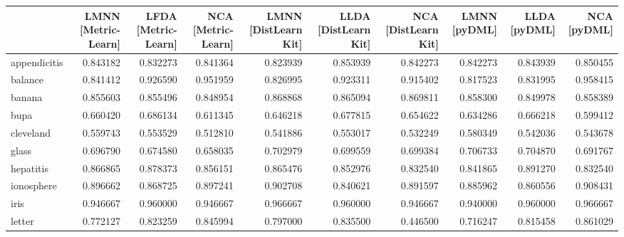 \begin{tabular}{lrrrrrrrrr}
\toprule
{} &  LMNN [Metric-Learn] &  LFDA [Metric-Learn] &  NCA [Metric-Learn] &  LMNN [DistLearn Kit] &  LLDA [DistLearn Kit] &  NCA [DistLearn Kit] &  LMNN [pyDML] &  LLDA [pyDML] &  NCA [pyDML] \\
\midrule
appendicitis    &             0.843182 &             0.832273 &            0.841364 &              0.823939 &              0.853939 &             0.842273 &      0.842273 &      0.843939 &     0.850455 \\
balance         &             0.841412 &             0.926590 &            0.951959 &              0.826995 &              0.923311 &             0.915402 &      0.817523 &      0.831995 &     0.958415 \\
banana          &             0.855603 &             0.855496 &            0.848954 &              0.868868 &              0.865094 &             0.869811 &      0.858300 &      0.849978 &     0.858389 \\
bupa            &             0.660420 &             0.686134 &            0.611345 &              0.646218 &              0.677815 &             0.654622 &      0.634286 &      0.666218 &     0.599412 \\
cleveland       &             0.559743 &             0.553529 &            0.512810 &              0.541886 &              0.553017 &             0.532249 &      0.580349 &      0.542036 &     0.543678 \\
glass           &             0.696790 &             0.674580 &            0.658035 &              0.702979 &              0.699559 &             0.699384 &      0.706733 &      0.704870 &     0.691767 \\
hepatitis       &             0.866865 &             0.878373 &            0.856151 &              0.865476 &              0.852976 &             0.832540 &      0.841865 &      0.891270 &     0.832540 \\
ionosphere      &             0.896662 &             0.868725 &            0.897241 &              0.902708 &              0.840621 &             0.891597 &      0.885962 &      0.860556 &     0.908431 \\
iris            &             0.946667 &             0.960000 &            0.946667 &              0.966667 &              0.960000 &             0.946667 &      0.940000 &      0.960000 &     0.966667 \\
letter          &             0.772127 &             0.823259 &            0.845994 &              0.797000 &              0.835500 &             0.446500 &      0.716247 &      0.815458 &     0.861029 \\

\end{tabular}
